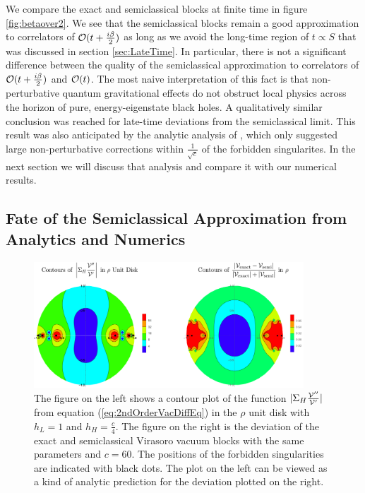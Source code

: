 \documentclass[12pt]{article}
\numberwithin{equation}{section}
\newcommand{\CO}{{\cal O}}
\newcommand{\CV}{{\cal V}}
\begin{document}
We compare the exact and semiclassical blocks at finite time in figure \ref{fig:betaover2}.   We see that the semiclassical blocks remain a good approximation to correlators of $\CO(t + \frac{i \beta}{2})$ as long as we avoid the long-time region of $t \propto S$ that was discussed in section \ref{sec:LateTime}.  In particular,  there is not a significant difference between the quality of the semiclassical approximation to correlators of $\CO(t + \frac{i \beta}{2})$ and $\CO(t)$.  The most naive interpretation of this fact is that non-perturbative quantum gravitational effects do not obstruct local physics across the horizon of pure, energy-eigenstate black holes.  A qualitatively similar conclusion was reached for late-time deviations \cite{Kabat:2014kfa} from the semiclassical limit.  This result was also anticipated by the analytic analysis of \cite{Fitzpatrick:2016ive}, which only suggested large non-perturbative corrections within $\frac{1}{\sqrt{c}}$ of the forbidden singularites.  In the next section we will discuss that analysis and compare it with our numerical results.


\subsection{Fate of the Semiclassical Approximation from Analytics and Numerics}
\label{sec:FateSemiclassical}

\begin{figure}[t]
\centering{}\includegraphics[width=0.9\textwidth]{ContoursSigmaFunction}
\caption{The figure on the left shows a contour plot of the function $|\Sigma_{H} \frac{\CV''}{\CV'}|$ from equation (\ref{eq:2ndOrderVacDiffEq}) in the $\rho$ unit disk with $h_L = 1$ and $h_H = \frac{c}{4}$.  The figure on the right is the deviation of the exact and semiclassical Virasoro vacuum blocks with the same parameters and $c = 60$.  The positions of the forbidden singularities are indicated with black dots. The plot on the left can be viewed as a kind of analytic prediction for the deviation plotted on the right. }
\label{fig:ContoursSigmaFunction}
\end{figure}
\end{document}
